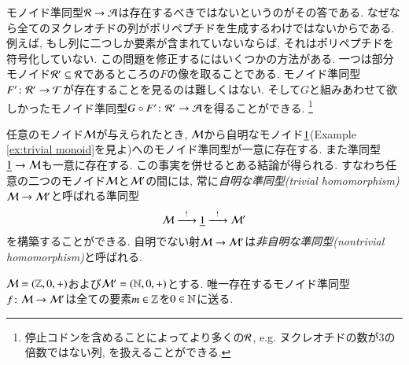 \begin{application}
モノイド準同型$\mathcal{R}\rightarrow\mathcal{A}$は存在するべきではないというのがその答である. なぜなら全てのヌクレオチドの列がポリペプチドを生成するわけではないからである. 例えば, もし列に二つしか要素が含まれていないならば, それはポリペプチドを符号化していない. この問題を修正するにはいくつかの方法がある. 一つは部分モノイド$\mathcal{R}'\subseteq\mathcal{R}$であるところの$F$の像を取ることである. モノイド準同型$F'\colon\mathcal{R}'\rightarrow\mathcal{T}$が存在することを見るのは難しくはない. そして$G$と組みあわせて欲しかったモノイド準同型$G\circ F'\colon\mathcal{R}'\rightarrow\mathcal{A}$を得ることができる.
\footnote{停止コドンを含めることによってより多くの$\mathcal{R}$, e.g. ヌクレオチドの数が3の倍数ではない列, を扱えることができる.}

\end{application}

\begin{example}\label{ex:trivial monoid homomorphism}


任意のモノイド$\mathcal{M}$が与えられたとき, $\mathcal{M}$から自明なモノイド$\underline{1}$(Example \ref{ex:trivial monoid}を見よ)へのモノイド準同型が一意に存在する. また準同型$\underline{1}\rightarrow\mathcal{M}$も一意に存在する. この事実を併せるとある結論が得られる. すなわち任意の二つのモノイド$\mathcal{M}$と$\mathcal{M}'$の間には, 常に\emph{自明な準同型(trivial homomorphism) $\mathcal{M}\rightarrow\mathcal{M}'$}と呼ばれる準同型$$\mathcal{M}\xrightarrow{\ \ !\ \ }\underline{1}\xrightarrow{\ \ !\ \ }\mathcal{M}'$$を構築することができる.
自明でない射$\mathcal{M}\rightarrow\mathcal{M}'$は\emph{非自明な準同型(nontrivial homomorphism)}と呼ばれる.

\end{example}

\begin{proposition}\label{prop:int to nat trivial}


$\mathcal{M}=({\mathbb Z},0,+)$および$\mathcal{M}'=({\mathbb N},0,+)$とする. 唯一存在するモノイド準同型$f\colon\mathcal{M}\rightarrow\mathcal{M}'$は全ての要素$m\in{\mathbb Z}$を$0\in{\mathbb N}$に送る.

\end{proposition}

